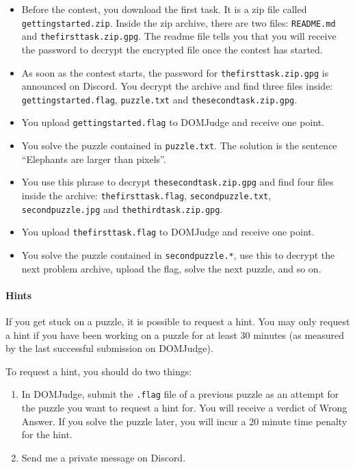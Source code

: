 \documentclass[fontsize=10pt,a4paper,DIV=12,parskip=half]{scrarticle}
\begin{document}
\begin{itemize}
	\item Before the contest, you download the first task. It is a zip file called
		\texttt{gettingstarted.zip}. Inside the zip archive, there are two files:
		\texttt{README.md} and \texttt{thefirsttask.zip.gpg}. The readme file tells
		you that you will receive the password to decrypt the encrypted file once
		the contest has started.
	\item As soon as the contest starts, the password for \texttt{thefirsttask.zip.gpg}
		is announced on Discord. You decrypt the archive and find three files inside:
		\texttt{gettingstarted.flag}, \texttt{puzzle.txt} and \texttt{thesecondtask.zip.gpg}.
	\item You upload \texttt{gettingstarted.flag} to DOMJudge and receive one point.
	\item You solve the puzzle contained in \texttt{puzzle.txt}. The solution is the
		sentence \enquote{Elephants are larger than pixels}.
	\item You use this phrase to decrypt \texttt{thesecondtask.zip.gpg} and find
		four files inside the archive: \texttt{thefirsttask.flag}, \texttt{secondpuzzle.txt},
		\texttt{secondpuzzle.jpg} and \texttt{thethirdtask.zip.gpg}.
	\item You upload \texttt{thefirsttask.flag} to DOMJudge and receive one point.
	\item You solve the puzzle contained in \texttt{secondpuzzle.*}, use this to decrypt the
		next problem archive, upload the flag, solve the next puzzle, and so on.
\end{itemize}

\paragraph{Hints}
If you get stuck on a puzzle, it is possible to request a hint. You may only
request a hint if you have been working on a puzzle for at least 30 minutes
(as measured by the last successful submission on DOMJudge).

To request a hint, you should do two things:
\begin{enumerate}
	\item In DOMJudge, submit the \texttt{.flag} file of a previous puzzle as an attempt for the puzzle you
		want to request a hint for. You will receive a verdict of Wrong Answer. If you solve
		the puzzle later, you will incur a 20 minute time penalty for the hint.
	\item Send me a private message on Discord.
\end{enumerate}
\end{document}

